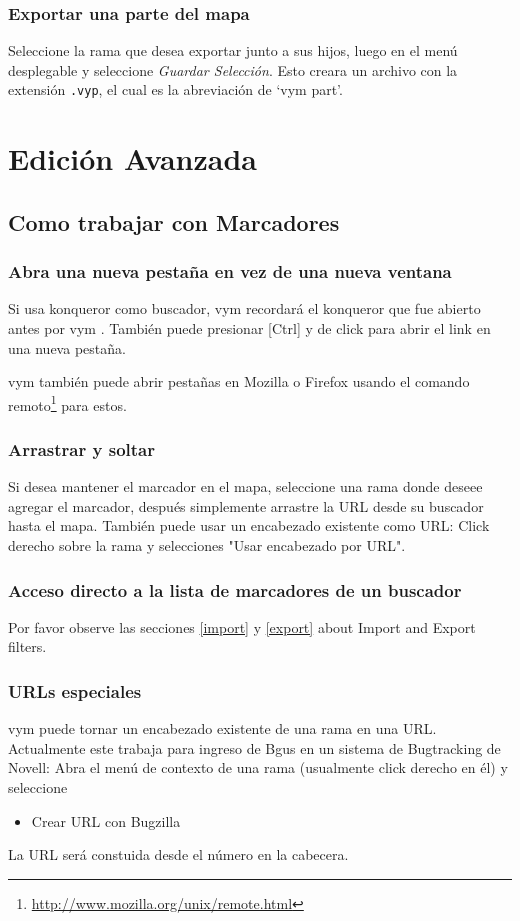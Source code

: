 \documentclass{article}
\newcommand{\vym}{{\sc vym }}
\newcommand{\key}[1]{[#1]}
\begin{document}
\subsubsection*{Exportar una parte del mapa}
Seleccione la rama que desea exportar junto a sus hijos, luego en el men\'u desplegable y seleccione {\em Guardar Selecci\'on}. Esto creara un archivo con la extensi\'on {\tt .vyp}, el cual es la abreviaci\'on de \lq \vym part\rq.

\section{Edici\'on Avanzada}

\subsection{Como trabajar con Marcadores} \label{bookmarks}
\subsubsection*{Abra una nueva pesta\~na en vez de una nueva ventana}
Si usa konqueror como buscador, \vym recordar\'a el konqueror que fue abierto antes por \vym. Tambi\'en puede presionar \key{Ctrl} y de click para abrir el link en una nueva pesta\~na.

\vym tambi\'en puede abrir pesta\~nas en Mozilla o Firefox usando el comando remoto\footnote{\href{http://www.mozilla.org/unix/remote.html}{http://www.mozilla.org/unix/remote.html}}
para estos.

\subsubsection*{Arrastrar y soltar}
Si desea mantener el marcador en el mapa, seleccione una rama donde deseee agregar el marcador,
despu\'es simplemente arrastre la URL desde su buscador hasta el mapa. Tambi\'en puede usar un encabezado existente como 
URL: Click derecho sobre la rama y selecciones "Usar encabezado por URL".

\subsubsection*{Acceso directo a la lista de marcadores de un buscador}
Por favor observe las secciones \ref{import} y \ref{export} about
Import and Export filters.

\subsubsection*{URLs especiales}
\vym puede tornar un encabezado existente de una rama en una URL. Actualmente
este trabaja para ingreso de Bgus en un sistema de Bugtracking de Novell: Abra el 
men\'u de contexto de una rama (usualmente click derecho en \'el) y seleccione
\begin{itemize}
    \item Crear URL con Bugzilla
\end{itemize}
La URL ser\'a constuida desde el n\'umero en la cabecera.
\end{document}
